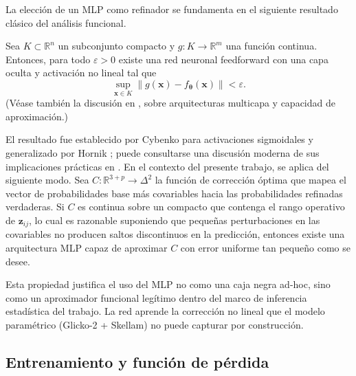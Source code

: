 La elecci\'on de un MLP como refinador se fundamenta en el siguiente resultado cl\'asico del an\'alisis funcional.

\begin{teo}\label{teo:universal}
	Sea $K \subset \mathbb{R}^n$ un subconjunto compacto y $g: K \to \mathbb{R}^m$ una funci\'on continua. Entonces, para todo $\varepsilon > 0$ existe una red neuronal feedforward con una capa oculta y activaci\'on no lineal tal que
	\[
	\sup_{\mathbf{x} \in K} \| g(\mathbf{x}) - f_{\boldsymbol{\theta}}(\mathbf{x}) \| < \varepsilon.
	\]
	(V\'ease tambi\'en la discusi\'on en \cite{solorzano2025rn}, sobre arquitecturas multicapa y capacidad de aproximaci\'on.)
\end{teo}

El resultado fue establecido por Cybenko \cite{Cybenko1989} para activaciones sigmoidales y generalizado por Hornik \cite{Hornik1989}; puede consultarse una discusi\'on moderna de sus implicaciones pr\'acticas en \cite{Charu2018}. En el contexto del presente trabajo, se aplica del siguiente modo. Sea $C: \mathbb{R}^{3+p} \to \Delta^2$ la funci\'on de correcci\'on \'optima que mapea el vector de probabilidades base m\'as covariables hacia las probabilidades refinadas verdaderas. Si $C$ es continua sobre un compacto que contenga el rango operativo de $\mathbf{z}_{ij}$, lo cual es razonable suponiendo que peque\~nas perturbaciones en las covariables no producen saltos discontinuos en la predicci\'on, entonces existe una arquitectura MLP capaz de aproximar $C$ con error uniforme tan peque\~no como se desee.

Esta propiedad justifica el uso del MLP no como una caja negra ad-hoc, sino como un aproximador funcional leg\'itimo dentro del marco de inferencia estad\'istica del trabajo. La red aprende la correcci\'on no lineal que el modelo param\'etrico (Glicko-2 + Skellam) no puede capturar por construcci\'on.

\subsection{Entrenamiento y funci\'on de p\'erdida}
\label{subsec:mlp_entrenamiento}

